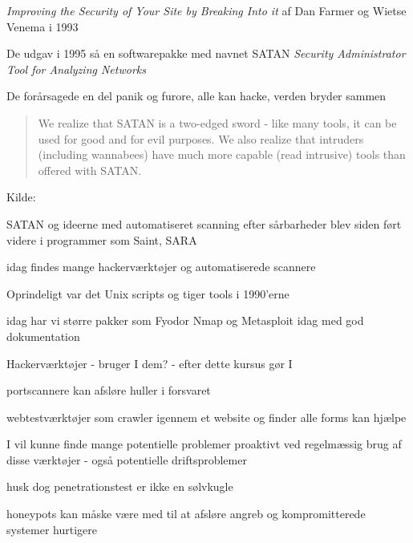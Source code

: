 \documentclass[20pt,landscape,a4paper,footrule]{foils}
\begin{document}

\begin{list1}
\item \emph{Improving the Security of Your Site by Breaking Into it} af
Dan Farmer og Wietse Venema i 1993 
\item De udgav i 1995 så en softwarepakke med navnet SATAN
\emph{Security Administrator Tool for Analyzing Networks}
\item De forårsagede en del panik og furore, alle kan hacke, verden bryder sammen

\vskip 1cm
\begin{quote}
We realize that SATAN is a two-edged sword - like
many tools, it can be used for good and for evil
purposes. We also realize that intruders (including
wannabees) have much more capable (read intrusive)
tools than offered with SATAN. 
\end{quote}
\end{list1}

\vskip 1cm
Kilde:


\begin{list1}
\item SATAN og ideerne med automatiseret scanning efter sårbarheder
  blev siden ført videre i programmer som Saint, SARA

\item idag findes
  mange hackerværktøjer og automatiserede scannere
\begin{list2}
\item Oprindeligt var det Unix scripts og tiger tools i 1990'erne 

\item idag har vi større pakker som Fyodor Nmap og Metasploit idag med god dokumentation
\end{list2}
\end{list1}




\begin{list1}
\item Hackerværktøjer - bruger I dem? - efter dette kursus gør I 
\item portscannere kan afsløre huller i forsvaret
\item webtestværktøjer som crawler igennem et website og finder alle
  forms kan hjælpe
\item I vil kunne finde mange potentielle problemer proaktivt ved
  regelmæssig brug af disse værktøjer - også potentielle driftsproblemer
\item husk dog penetrationstest er ikke en sølvkugle
\item honeypots kan måske være med til at afsløre angreb og
  kompromitterede systemer hurtigere
\end{list1}
\end{document}
